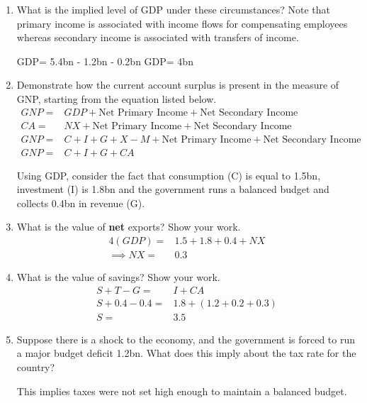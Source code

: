 \documentclass[12pt]{article}
\begin{document}
\begin{enumerate}[1)]
	\item What is the implied level of GDP under these circumstances? Note that primary income is associated with income flows for compensating employees whereas secondary income is associated with transfers of income. 
	
	\vspace{0.2in}
	GDP= 5.4bn - 1.2bn - 0.2bn
	GDP= 4bn
	\vspace{0.2in}
	
	\item Demonstrate how the current account surplus is present in the measure of GNP, starting from the equation listed below.
	\begin{align*}
	GNP = & GDP + \text{Net Primary Income} + \text{Net Secondary Income}\\
	CA= & NX+ \text{Net Primary Income} + \text{Net Secondary Income}\\
	GNP= & C+I+G+X-M+\text{Net Primary Income} + \text{Net Secondary Income}\\
	GNP= & C+I+G+CA
	\end{align*}

	
	Using GDP, consider the fact that consumption (C) is equal to 1.5bn, investment (I) is 1.8bn and the government runs a balanced budget and collects 0.4bn in revenue (G). 
	
	\item What is the value of {\bf net} exports? Show your work.
	\begin{align*}
	4 (GDP) = & 1.5 + 1.8 + 0.4 + NX\\
	\implies NX = & 0.3
	\end{align*}
	
	\item What is the value of savings? Show your work.
	\begin{align*}
	S+T-G= &I+CA\\
	S+0.4-0.4= & 1.8+(1.2+0.2+0.3)\\
	S= &3.5
	\end{align*}
	
	\item Suppose there is a shock to the economy, and the government is forced to run a major budget deficit 1.2bn.
	What does this imply about the tax rate for the country?
	
	\vspace{0.2in}
	This implies taxes were not set high enough to maintain a balanced budget. 
	\vspace{0.2in}
	

\end{enumerate}
\end{document}
